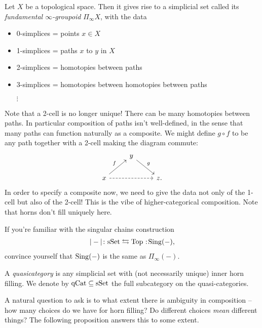 \documentclass[11pt]{amsart}
\begin{document}
\begin{example} Let $X$ be a topological space. Then it gives rise to a simplicial set called its \textit{fundamental $\infty$-groupoid} $\Pi_{\infty} X$, with the data
\begin{itemize}
    \item 0-simplices = points $x \in X$
    \item 1-simplices = paths $x$ to $y$ in $X$
    \item 2-simplices = homotopies between paths
    \item 3-simplices = homotopies between homotopies between paths
    \item[$\vdots$]
\end{itemize}
Note that a 2-cell is no longer unique! There can be many homotopies between paths. In particular composition of paths isn't well-defined, in the sense that many paths can function naturally as a composite. We might define $g\circ f$ to be any path together with a 2-cell making the diagram commute:
\[ \begin{tikzcd}
     & y\ar[dr,"g" above right]\\
    x\ar[ur,"f" above left]\ar[rr,dashed] &  & z.
\end{tikzcd} \]
In order to specify a composite now, we need to give the data not only of the 1-cell but also of the 2-cell! This is the vibe of higher-categorical composition. Note that horns don't fill uniquely here.
\end{example}

\begin{exercise} If you're familiar with the singular chains construction
\begin{align*}
    |-| \colon \sSet \leftrightarrows \Top \noloc \Sing(-),
\end{align*}
convince yourself that $\mathrm{Sing}(-)$ is the same as $\Pi_\infty(-)$.
\end{exercise}


\begin{definition} A \textit{quasicategory} is any simplicial set with (not necessarily unique) inner horn filling. We denote by $\mathrm{qCat} \subseteq \mathrm{sSet}$ the full subcategory on the quasi-categories.
\end{definition}

A natural question to ask is to what extent there is ambiguity in composition -- how many choices do we have for horn filling? Do different choices \textit{mean} different things? The following proposition answers this to some extent.
\end{document}
